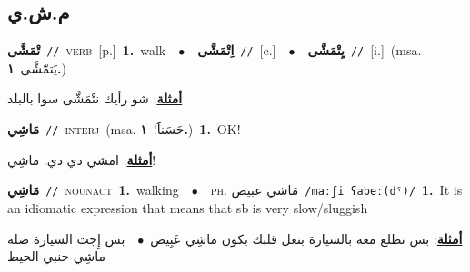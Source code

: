 \documentclass[10pt,a4paper,twoside]{article} %
\begin{document}
\begin{multicols}{2}
\vspace{-3mm}
\subsection*{\color{blue}\foreignlanguage{arabic}{م.ش.ي}\color{blue}{}} 

{\setlength\topsep{0pt}\textbf{\foreignlanguage{arabic}{تْمَشَّى}}\ {\color{gray}\texttt{//}\color{black}}\ \textsc{verb}\ [p.]\ \textbf{1.}~walk\ \ $\bullet$\ \ \setlength\topsep{0pt}\textbf{\foreignlanguage{arabic}{اِتْمَشَّى}}\ {\color{gray}\texttt{//}\color{black}}\ [c.]\ \ $\bullet$\ \ \setlength\topsep{0pt}\textbf{\foreignlanguage{arabic}{يِتْمَشَّى}}\ {\color{gray}\texttt{//}\color{black}}\ [i.]\ \color{gray}(msa. \foreignlanguage{arabic}{يَتمّشَّى}~\foreignlanguage{arabic}{\textbf{١.}})\color{black}\  \begin{flushright}\color{gray}\foreignlanguage{arabic}{\textbf{\underline{\foreignlanguage{arabic}{أمثلة}}}: شو رأيك نتْمَشَّى سوا بالبلد}\end{flushright}\color{black}} \vspace{2mm}

{\setlength\topsep{0pt}\textbf{\foreignlanguage{arabic}{مَاشِي}}\ {\color{gray}\texttt{//}\color{black}}\ \textsc{interj}\ \color{gray}(msa. \foreignlanguage{arabic}{حَسَناََ!}~\foreignlanguage{arabic}{\textbf{١.}})\color{black}\ \textbf{1.}~OK!\  \begin{flushright}\color{gray}\foreignlanguage{arabic}{\textbf{\underline{\foreignlanguage{arabic}{أمثلة}}}: امشي دي دي. ماشِي!}\end{flushright}\color{black}} \vspace{2mm}

{\setlength\topsep{0pt}\textbf{\foreignlanguage{arabic}{مَاشِي}}\ {\color{gray}\texttt{//}\color{black}}\ \textsc{noun\textunderscore act}\ \textbf{1.}~walking\ \ $\bullet$\ \ \textsc{ph.} \color{gray} \foreignlanguage{arabic}{مَاشي عبيض}\color{black}\ {\color{gray}\texttt{/{\sffamily maːʃi ʕabeː(dˤ)}/}\color{black}}\ \textbf{1.}~It is an idiomatic expression that means that sb is very slow/sluggish\  \begin{flushright}\color{gray}\foreignlanguage{arabic}{\textbf{\underline{\foreignlanguage{arabic}{أمثلة}}}: بس تطلع معه بالسيارة بنعل قلبك بكون ماشِي عَبِيض\ $\bullet$\ \  بس إِجت السيارة ضله ماشِي جنبي الحيط}\end{flushright}\color{black}} \vspace{2mm}


\end{multicols}
\end{document}
